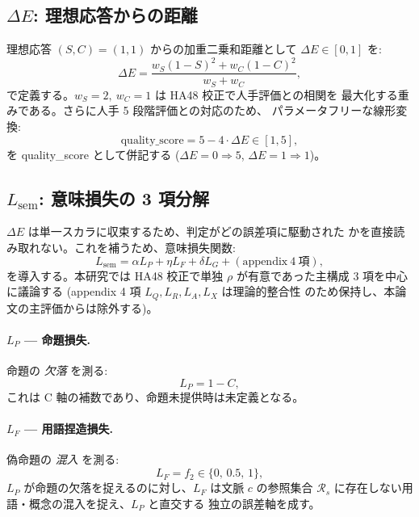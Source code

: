 \subsection{$\Delta E$: 理想応答からの距離}
\label{sec:method:delta_e}

理想応答 $(S, C) = (1, 1)$ からの加重二乗和距離として
$\Delta E \in [0, 1]$ を:
\begin{equation}
\label{eq:delta_e}
\Delta E = \frac{w_S (1 - S)^2 + w_C (1 - C)^2}{w_S + w_C},
\end{equation}
で定義する。$w_S = 2,\ w_C = 1$ は HA48 校正で人手評価との相関を
最大化する重みである。さらに人手 5 段階評価との対応のため、
パラメータフリーな線形変換:
\begin{equation}
\label{eq:quality_score}
\mathrm{quality\_score} = 5 - 4 \cdot \Delta E \in [1, 5],
\end{equation}
を quality\_score として併記する ($\Delta E = 0 \Rightarrow 5$,
$\Delta E = 1 \Rightarrow 1$)。

\subsection{$L_{\mathrm{sem}}$: 意味損失の 3 項分解}
\label{sec:method:l_sem}

$\Delta E$ は単一スカラに収束するため、判定がどの誤差項に駆動された
かを直接読み取れない。これを補うため、意味損失関数:
\begin{equation}
\label{eq:l_sem}
L_{\mathrm{sem}} = \alpha L_P + \eta L_F + \delta L_G + \mathrm{(appendix\ 4\ \mbox{項})},
\end{equation}
を導入する。本研究では HA48 校正で単独 $\rho$ が有意であった主構成
3 項を中心に議論する (appendix 4 項 $L_Q, L_R, L_A, L_X$ は理論的整合性
のため保持し、本論文の主評価からは除外する)。

\paragraph{$L_P$ — 命題損失.} 命題の \emph{欠落} を測る:
\begin{equation}
L_P = 1 - C,
\end{equation}
これは C 軸の補数であり、命題未提供時は未定義となる。

\paragraph{$L_F$ — 用語捏造損失.} 偽命題の \emph{混入} を測る:
\begin{equation}
L_F = f_2 \in \{0,\, 0.5,\, 1\},
\end{equation}
$L_P$ が命題の欠落を捉えるのに対し、$L_F$ は文脈 $c$ の参照集合
$\mathcal{R}_s$ に存在しない用語・概念の混入を捉え、$L_P$ と直交する
独立の誤差軸を成す。

